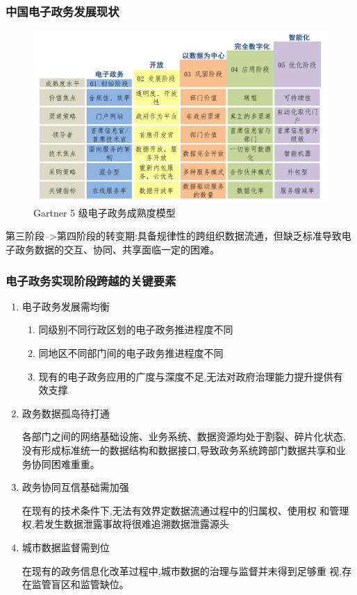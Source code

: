 \documentclass[11pt]{beamer}
\begin{document}
\begin{frame}
	\frametitle{{中国电子政务发展现状}}
\begin{figure}
	\centering
	\includegraphics[width=0.75\linewidth]{figures/gov/3}
	\caption{Gartner 5 级电子政务成熟度模型}
	\label{fig:3}
\end{figure}
	{\footnotesize 第三阶段-->第四阶段的转变期:具备规律性的跨组织数据流通，但缺乏标准导致电子政务数据的交互、协同、共享面临一定的困难。}
\end{frame}

\begin{frame}
	\frametitle{{电子政务实现阶段跨越的关键要素}}
	\begin{enumerate}
		\item 电子政务发展需均衡
		\begin{enumerate}
			\item 同级别不同行政区划的电子政务推进程度不同
			\item 同地区不同部门间的电子政务推进程度不同
			\item 现有的电子政务应用的广度与深度不足,无法对政府治理能力提升提供有
			效支撑
		\end{enumerate}
		\item 政务数据孤岛待打通
		
		各部门之间的网络基础设施、业务系统、数据资源均处于割裂、碎片化状态,
		没有形成标准统一的数据结构和数据接口,导致政务系统跨部门数据共享和业
		务协同困难重重。
		\item 政务协同互信基础需加强
		
		在现有的技术条件下,无法有效界定数据流通过程中的归属权、使用权
		和管理权,若发生数据泄露事故将很难追溯数据泄露源头
		\item 城市数据监督需到位
		
		在现有的政务信息化改革过程中,城市数据的治理与监督并未得到足够重
		视,存在监管盲区和监管缺位。
	\end{enumerate}
\end{frame}
\end{document}

